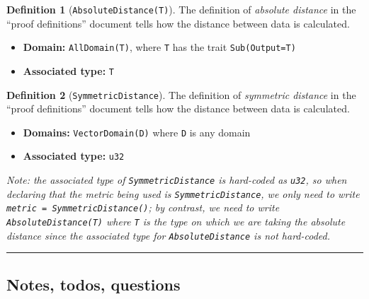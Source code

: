 \documentclass[11pt,a4paper]{article}
\theoremstyle{definition}
\newtheorem{definition}{Definition}[section]
\newcommand{\horizline}{\noindent\rule{\textwidth}{1pt}}
\newcommand{\metricDefn}[1]{The definition of \emph{#1} in the ``proof definitions'' document tells how the distance between data is calculated.}
\begin{document}
\begin{definition}[\texttt{AbsoluteDistance(T)}]
\metricDefn{absolute distance}
\begin{itemize}
    \item \textbf{Domain:} \texttt{AllDomain(T)}, where \texttt{T} has the trait \texttt{Sub(Output=T)}
    \item \textbf{Associated type:} \texttt{T}
\end{itemize}
\end{definition}

\begin{definition}[\texttt{SymmetricDistance}]
\metricDefn{symmetric distance}
\begin{itemize}
    \item \textbf{Domains:} \texttt{VectorDomain(D)} where \texttt{D} is any domain
    \item \textbf{Associated type:} \texttt{u32}
\end{itemize}
\end{definition}

\emph{Note: the associated type of \texttt{SymmetricDistance} is hard-coded as \texttt{u32}, so when declaring that the metric being used is \texttt{SymmetricDistance}, we only need to write \texttt{metric = SymmetricDistance()}; by contrast, we need to write \texttt{AbsoluteDistance(T)} where \texttt{T} is the type on which we are taking the absolute distance since the associated type for \texttt{AbsoluteDistance} is not hard-coded.}

\horizline

\subsection{Notes, todos, questions}
\end{document}
